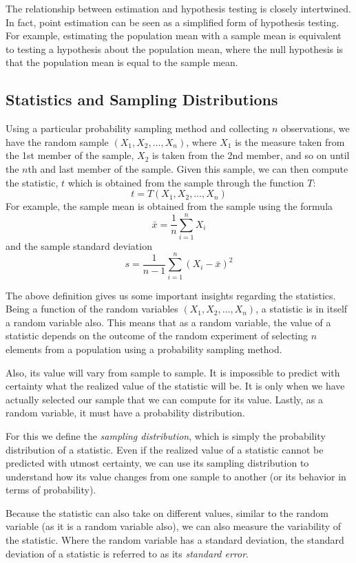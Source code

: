 \documentclass{article}
\begin{document}
The relationship between estimation and hypothesis testing is closely intertwined. In fact, point estimation can be seen as a simplified form of hypothesis testing. For example, estimating the population mean with a sample mean is equivalent to testing a hypothesis about the population mean, where the null hypothesis is that the population mean is equal to the sample mean.

\subsection{Statistics and Sampling Distributions}

Using a particular probability sampling method and collecting $n$ observations, we have the random sample $(X_1,X_2,\dots,X_n)$, where $X_1$ is the measure taken from the 1st member of the sample, $X_2$ is taken from the 2nd member, and so on until the $n$th and last member of the sample. Given this sample, we can then compute the statistic, $t$ which is obtained from the sample through the function $T$:
$$t=T(X_1,X_2,\dots,X_n)$$
For example, the sample mean is obtained from the sample using the formula
$$\bar{x}=\frac{1}{n}\sum_{i=1}^{n}{X_i}$$
and the sample standard deviation
$$s=\frac{1}{n-1}\sum_{i=1}^{n}{(X_i-\bar{x})^2}$$

The above definition gives us some important insights regarding the statistics. Being a function of the random variables $(X_1,X_2,\dots,X_n)$, a statistic is in itself a random variable also. This means that as a random variable, the value of a statistic depends on the outcome of the random experiment of selecting $n$ elements from a population using a probability sampling method.

Also, its value will vary from sample to sample. It is impossible to predict with certainty what the realized value of the statistic will be. It is only when we have actually selected our sample that we can compute for its value. Lastly, as a random variable, it must have a probability distribution.

For this we define the \emph{sampling distribution}, which is simply the probability distribution of a statistic. Even if the realized value of a statistic cannot be predicted with utmost certainty, we can use its sampling distribution to understand how its value changes from one sample to another (or its behavior in terms of probability).

Because the statistic can also take on different values, similar to the random variable (as it is a random variable also), we can also measure the variability of the statistic. Where the random variable has a standard deviation, the standard deviation of a statistic is referred to as its \emph{standard error}.
\end{document}
